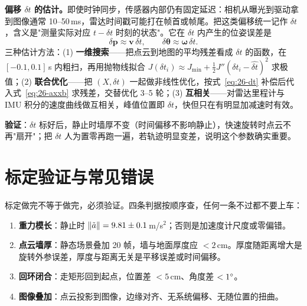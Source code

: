 \textbf{偏移 $\delta t$ 的估计。}即使时钟同步，传感器内部仍有固定延迟：相机从曝光到驱动拿到图像通常 10--50\,ms，雷达时间戳可能打在帧首或帧尾。把这类偏移统一记作 $\delta t$，含义是"测量实际对应 $t-\delta t$ 时刻的状态"。它在 $\delta t$ 内产生的位姿误差是
\begin{equation}
\delta\bm{p}\approx\bm{v}\,\delta t,\qquad \delta\bm{\theta}\approx\bm{\omega}\,\delta t.
\label{eq:26-dt}
\end{equation}
三种估计方法：(1) \textbf{一维搜索}——把点云到地图的平均残差看成 $\delta t$ 的函数，在 $[-0.1,0.1]$\,s 内粗扫，再用抛物线拟合 $J(\delta t_i)\approx J_{\min}+\tfrac12J''(\delta t_i-\hat{\delta t})^2$ 求极值；(2) \textbf{联合优化}——把 $(X,\delta t)$ 一起做非线性优化，按式~\eqref{eq:26-dt} 补偿后代入式~\eqref{eq:26-axxb} 求残差，交替优化 3--5 轮；(3) \textbf{互相关}——对雷达里程计与 IMU 积分的速度曲线做互相关，峰值位置即 $\delta t$，快但只在有明显加减速时有效。

\textbf{验证}：$\delta t$ 标好后，静止时墙厚不变（时间偏移不影响静止），快速旋转时点云不再"扇开"；把 $\delta t$ 人为置零再跑一遍，若轨迹明显变差，说明这个参数确实重要。

\section{标定验证与常见错误}\label{sec:26-verify}

标定做完不等于做完，必须验证。四条判据按顺序查，任何一条不过都不要上车：

\begin{enumerate}
  \item \textbf{重力模长}：静止时 $\left\lVert \tilde{a} \right\rVert=9.81\pm0.1$\,m/s$^2$；否则是加速度计尺度或零偏错。
  \item \textbf{点云墙厚}：静态场景叠加 20 帧，墙与地面厚度应 $<2$\,cm。厚度随距离增大是旋转外参误差，厚度与距离无关是平移误差或时间偏移。
  \item \textbf{回环闭合}：走矩形回到起点，位置差 $<5$\,cm、角度差 $<1^\circ$。
  \item \textbf{图像叠加}：点云投影到图像，边缘对齐、无系统偏移、无随位置的扭曲。
\end{enumerate}


